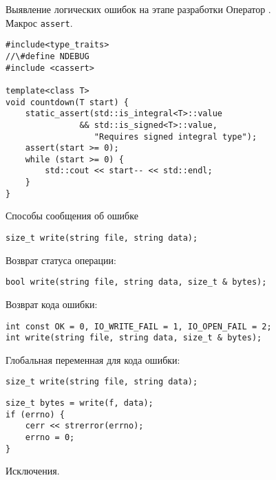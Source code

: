 \documentclass[aspectration=1610,t]{beamer}
\begin{document}
\begin{frame}[fragile]{Выявление логических ошибок на этапе разработки}
    \fakeitem Оператор .\\
    \fakeitem Макрос \texttt{assert}.
    \begin{lstlisting}
#include<type_traits>
//\#define NDEBUG
#include <cassert>

template<class T> 
void countdown(T start) {
    static_assert(std::is_integral<T>::value
               && std::is_signed<T>::value, 
                  "Requires signed integral type");
    assert(start >= 0);
    while (start >= 0) {
        std::cout << start-- << std::endl;
    }
}
    \end{lstlisting}
\end{frame}

\begin{frame}[fragile]{Способы сообщения об ошибке}
    \begin{lstlisting}
size_t write(string file, string data);
    \end{lstlisting}

        \pause\fakeitem Возврат статуса операции:
    \begin{lstlisting}
bool write(string file, string data, size_t & bytes);
    \end{lstlisting}

        \pause\fakeitem Возврат кода ошибки:
    \begin{lstlisting}
int const OK = 0, IO_WRITE_FAIL = 1, IO_OPEN_FAIL = 2;
int write(string file, string data, size_t & bytes);
    \end{lstlisting}

        \pause\fakeitem Глобальная переменная для кода ошибки:
    \begin{lstlisting}
size_t write(string file, string data);
    \end{lstlisting}

    \begin{lstlisting}
size_t bytes = write(f, data);
if (errno) {
    cerr << strerror(errno);
    errno = 0;
}
\end{lstlisting}
\pause\fakeitem Исключения.
\end{frame}
\end{document}
